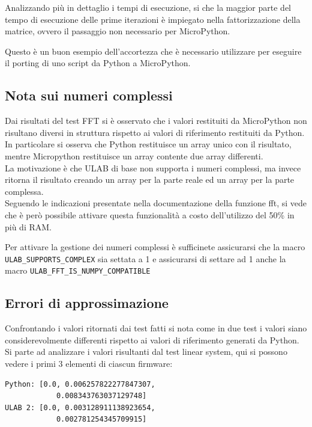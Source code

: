 \documentclass[12pt,a4paper]{report}
\begin{document}
Analizzando più in dettaglio i tempi di esecuzione, si che la maggior parte del tempo di esecuzione delle prime iterazioni è impiegato nella fattorizzazione della matrice, ovvero il passaggio non necessario per MicroPython.

Questo è un buon esempio dell'accortezza che è necessario utilizzare per eseguire il porting di uno script da Python a MicroPython.


\subsection{Nota sui numeri complessi}

Dai risultati del test FFT si è osservato che i valori restituiti da MicroPython non risultano diversi in struttura rispetto ai valori di riferimento restituiti da Python.
In particolare si osserva che Python restituisce un array unico con il risultato, mentre Micropython restituisce un array contente due array differenti.\\
La motivazione è che ULAB di base non supporta i numeri complessi, ma invece ritorna il risultato creando un array per la parte reale ed un array per la parte complessa.\\
Seguendo le indicazioni presentate nella documentazione della funzione fft, si vede che è però possibile attivare questa funzionalità a costo dell'utilizzo del 50\% in più di RAM.

Per attivare la gestione dei numeri complessi è sufficinete assicurarsi che la macro \texttt{ULAB\_SUPPORTS\_COMPLEX} sia settata a 1 e assicurarsi di settare ad 1 anche la macro \texttt{ULAB\_FFT\_IS\_NUMPY\_COMPATIBLE}

\subsection{Errori di approssimazione}

Confrontando i valori ritornati dai test fatti si nota come in due test i valori siano considerevolmente differenti rispetto ai valori di riferimento generati da Python. Si parte ad analizzare i valori risultanti dal test linear system, qui si possono vedere i primi 3 elementi di ciascun firmware:

\begin{verbatim}
Python: [0.0, 0.006257822277847307,
            0.008343763037129748]
ULAB 2: [0.0, 0.003128911138923654,
            0.002781254345709915]
\end{verbatim}
\end{document}
